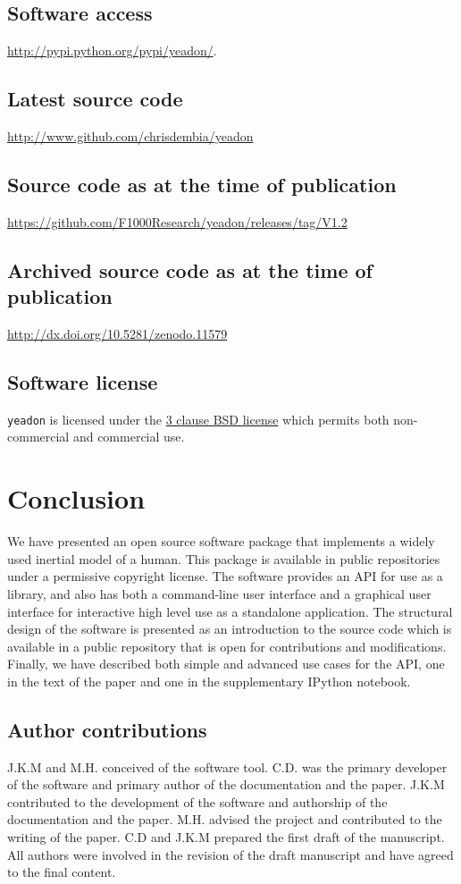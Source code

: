 \documentclass[10pt,a4paper,twocolumn]{article}
\begin{document}
\subsection*{Software access}
\url{http://pypi.python.org/pypi/yeadon/}.

\subsection*{Latest source code}
\url{http://www.github.com/chrisdembia/yeadon}

\subsection*{Source code as at the time of publication}
\url{https://github.com/F1000Research/yeadon/releases/tag/V1.2}

\subsection*{Archived source code as at the time of publication}
\url{http://dx.doi.org/10.5281/zenodo.11579} \cite{Christopher:11579}

\subsection*{Software license}
\verb+yeadon+ is licensed under the
\href{http://opensource.org/licenses/BSD-3-Clause}{3 clause BSD license} which
permits both non-commercial and commercial use.

\section*{Conclusion}
We have presented an open source software package that implements a widely used
inertial model of a human. This package is available in public repositories
under a permissive copyright license. The software provides an API for use as a
library, and also has both a command-line user interface and a graphical user
interface for interactive high level use as a standalone application. The
structural design of the software is presented as an introduction to the source
code which is available in a public repository that is open for contributions
and modifications. Finally, we have described both simple and advanced use
cases for the API, one in the text of the paper and one in the supplementary
IPython notebook.

\subsection*{Author contributions}
J.K.M and M.H. conceived of the software tool. C.D. was the primary developer
of the software and primary author of the documentation and the paper. J.K.M
contributed to the development of the software and authorship of the
documentation and the paper.  M.H. advised the project and contributed to the
writing of the paper. C.D and J.K.M prepared the first draft of the manuscript.
All authors were involved in the revision of the draft manuscript and have
agreed to the final content.
\end{document}
